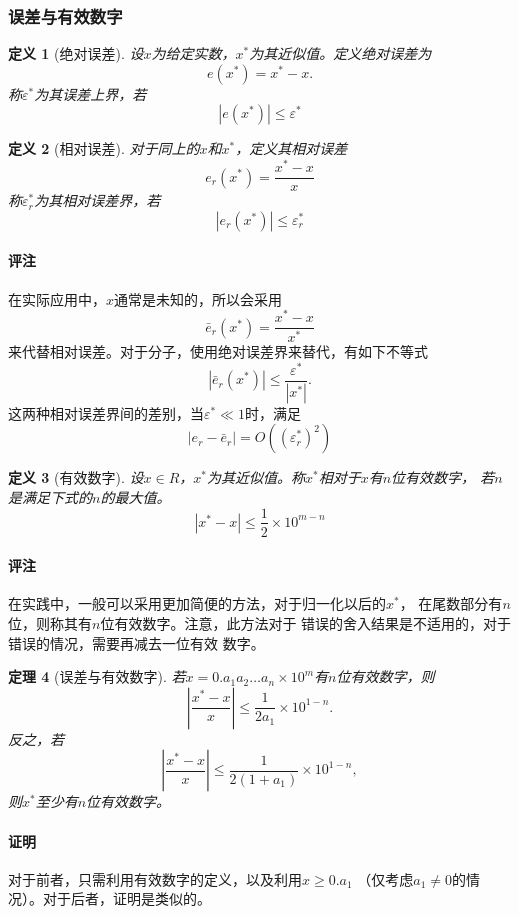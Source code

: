 \documentclass[12pt, a4paper]{article}
\theoremstyle{margin}
\newtheorem{thm}{定理}
\newtheorem{defi}[thm]{定义}
\newcommand{\aoneton}{a_1a_2\dots a_n}
\newcommand{\remark}{\paragraph{评注}}
\newcommand{\proof}{\paragraph{证明}}
\begin{document}
\subsubsection{误差与有效数字}
  \begin{defi}[绝对误差]
    设$x$为给定实数，$x^*$为其近似值。定义绝对误差为
    \[
      e(x^*) = x^* - x.
    \]
    称$\varepsilon^*$为其误差上界，若
    \[
      |e(x^*)| \le \varepsilon^*
    \]
  \end{defi}

  \begin{defi}[相对误差]
    对于同上的$x$和$x^*$，定义其相对误差
    \[
      e_r(x^*)=\frac{x^* - x}{x}
    \]
    称$\varepsilon_r^*$为其相对误差界，若
    \[
      |e_r(x^*)|\le\varepsilon_r^*
    \]
  \end{defi}
  \remark
    在实际应用中，$x$通常是未知的，所以会采用
    \[
      \bar{e}_r(x^*)=\frac{x^*-x}{x^*}
    \]
    来代替相对误差。对于分子，使用绝对误差界来替代，有如下不等式
    \[
      |\bar{e}_r(x^*)| \le \frac{\varepsilon^*}{|x^*|}.
    \]
    这两种相对误差界间的差别，当$\varepsilon^*\ll 1$时，满足
    \[
      |e_r-\bar{e}_r|=O((\varepsilon_r^*)^2)
    \]

  \begin{defi}[有效数字]
    设$x\in R$，$x^*$为其近似值。称$x^*$相对于$x$有$n$位有效数字，
    若$n$是满足下式的$n$的最大值。
    \[
      |x^* - x| \le \frac{1}{2} \times 10^{m - n}
    \]
  \end{defi}
  \remark
    在实践中，一般可以采用更加简便的方法，对于归一化以后的$x^*$，
    在尾数部分有$n$位，则称其有$n$位有效数字。注意，此方法对于
    错误的舍入结果是不适用的，对于错误的情况，需要再减去一位有效
    数字。

  \begin{thm}[误差与有效数字]
    若$x=0.\aoneton\times10^m$有$n$位有效数字，则
    \[
      \left|\frac{x^*-x}{x}\right| \le
      \frac{1}{2a_1}\times10^{1-n}.
    \]
    反之，若
    \[
      \left|\frac{x^*-x}{x}\right| \le
      \frac{1}{2(1+a_1)}\times 10^{1-n},
    \]
    则$x^*$至少有$n$位有效数字。
  \end{thm}
  \proof
    对于前者，只需利用有效数字的定义，以及利用$x\ge 0.a_1$
    （仅考虑$a_1\ne0$的情况）。对于后者，证明是类似的。
\end{document}
